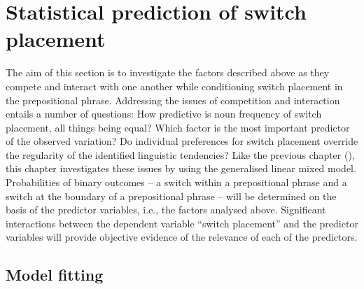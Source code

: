 \section{Statistical prediction of switch placement}

\noindent The aim of this section is to investigate the factors described above as they compete and interact with one another while conditioning switch placement in the prepositional phrase. Addressing the issues of competition and interaction entails a number of questions: How predictive is noun frequency of switch placement, all things being equal? Which factor is the most important predictor of the observed variation? Do individual preferences for switch placement override the regularity of the identified linguistic tendencies? Like the previous chapter (), this chapter investigates these issues by using the generalised linear mixed model. Probabilities of binary outcomes -- a switch within a prepositional phrase and a switch at the boundary of a prepositional phrase -- will be determined on the basis of the predictor variables, i.e., the factors analysed above. Significant interactions between the dependent variable “switch placement” and the predictor variables will provide objective evidence of the relevance of each of the predictors.

\subsection{Model fitting}

